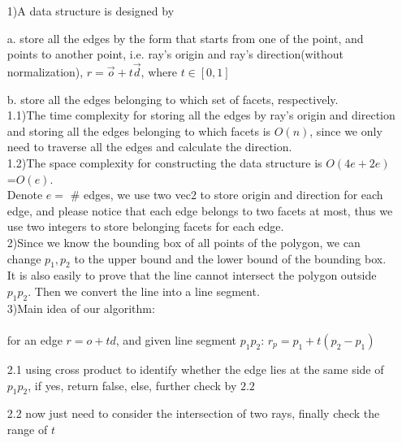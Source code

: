 \documentclass[]{article}
\begin{document}
\begin{enumerate}
	1)A data structure is designed by 
	\item[a.] store all the edges by the form that starts from one of the point, and points to another point, i.e. ray's origin and ray's direction(without normalization), $r=\vec{o}+ t\vec{d}$, where $t\in[0, 1]$
	\item[b.] store all the edges belonging to which set of facets, respectively.
	\\
	1.1)The time complexity for storing all the edges by ray's origin and direction and storing all the edges belonging to which facets is $O(n)$, since we only need to traverse all the edges and calculate the direction. \\
	1.2)The space complexity for constructing the data structure is $O(4e+2e)$=$O(e)$. \\
	Denote $e=$ \# edges, we use two vec2 to store origin and direction for each edge, and please notice that each edge belongs to two facets at most, thus we use two integers to store belonging facets for each edge.\\
	
	2)Since we know the bounding box of all points of the polygon, we can change $p_1, p_2$ to the upper bound and the lower bound of the bounding box. It is also easily to prove that the line cannot intersect the polygon outside $p_1p_2$.  Then  we convert the line into a line segment. \\
	
	3)Main idea of our algorithm: \\
	\vspace{0.05cm}
	\\
	for an edge $r=o+td$, and given line segment $p_1p_2$: $r_p = p_1 + t(p_2 - p_1)$
	\item[2.1] using cross product to identify whether the edge lies at the same side of $p_1p_2$, if yes, return false, else, further check by $2.2$
	\item[2.2] now just need to consider the intersection of two rays, finally check the range of $t$ \\
	
	\newpage
	

\end{enumerate}
\end{document}
